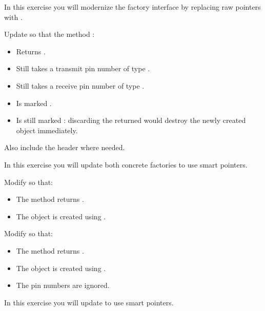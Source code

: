 \label{c4:set:4}

\label{c4:ex:4.1}
In this exercise you will modernize the factory interface by replacing raw pointers with
.

Update  so that the method :
\begin{itemize}
  \item Returns .
  \item Still takes a transmit pin number of type .
  \item Still takes a receive pin number of type .
  \item Is marked .
  \item Is still marked \code{[[nodiscard]]}: discarding the returned  would
    destroy the newly created object immediately.
\end{itemize}
Also include the header  where needed.

\label{c4:ex:4.2}
In this exercise you will update both concrete factories to use smart pointers.

Modify  so that:
\begin{itemize}
  \item The method  returns .
  \item The object is created using
    .
\end{itemize}

Modify  so that:
\begin{itemize}
  \item The method  returns .
  \item The object is created using .
  \item The pin numbers are ignored.
\end{itemize}

\label{c4:ex:4.3}
In this exercise you will update  to use smart pointers.

